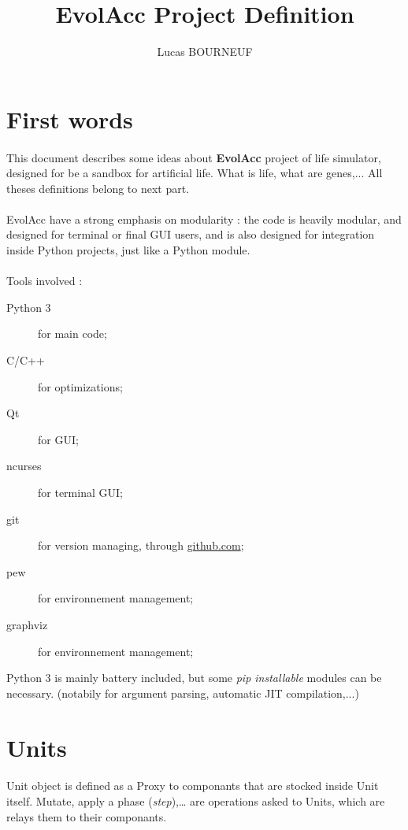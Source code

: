 \documentclass{report} %
\title{EvolAcc Project Definition}
\author{Lucas BOURNEUF}
\date{}
\begin{document}
\section*{First words}
    \paragraph*{}
    This document describes some ideas about \textbf{EvolAcc} project of life simulator, designed 
    for be a sandbox for artificial life. What is life, 
    what are genes,... All theses definitions belong to next part.
    \paragraph*{}
    EvolAcc have a strong emphasis on modularity : the code is heavily modular,
    and designed for terminal or final GUI users, and is also designed for 
    integration inside Python projects, just like a Python module.
    \paragraph*{}
    Tools involved : 
    \begin{description}
            \item[Python 3] for main code; 
            \item[C/C++] for optimizations;
            \item[Qt] for GUI; 
            \item[ncurses] for terminal GUI;
            \item[git] for version managing, through \url{github.com};
            \item[pew] for environnement management;
            \item[graphviz] for environnement management;
    \end{description}
    Python 3 is mainly battery included, but some \textit{pip installable} modules can be necessary. 
    (notabily for argument parsing, automatic JIT compilation,...)



\section*{Units}
    \paragraph*{}
    Unit object is defined as a Proxy to componants that are stocked inside Unit itself.
    Mutate, apply a phase (\textit{step}),… are operations asked to Units, which are 
    relays them to their componants.
\end{document}
